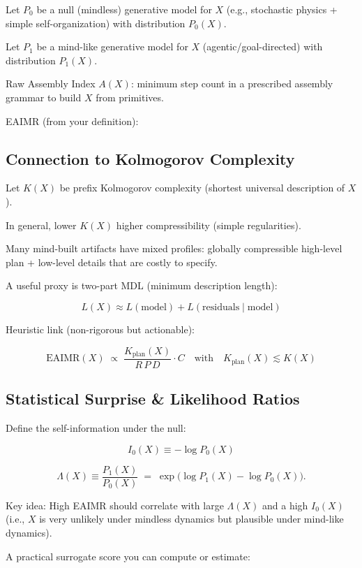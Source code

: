 \documentclass{article}
\begin{document}
Let \(P_0\) be a null (mindless) generative model for \(X\) (e.g., stochastic physics + simple self-organization) with distribution \(P_0(X)\).

Let \(P_1\) be a mind-like generative model for \(X\) (agentic/goal-directed) with distribution \(P_1(X)\).

Raw Assembly Index \(A(X)\): minimum step count in a prescribed assembly grammar to build \(X\) from primitives.

EAIMR (from your definition):


\subsection{Connection to Kolmogorov Complexity}

Let \(K(X)\) be prefix Kolmogorov complexity (shortest universal description of \(X\)).

In general, lower \(K(X)\) higher compressibility (simple regularities).

Many mind-built artifacts have mixed profiles: globally compressible high-level plan + low-level details that are costly to specify.

A useful proxy is two-part MDL (minimum description length):

\[L(X) \approx L(\text{model}) + L(\text{residuals}\mid\text{model})\]

Heuristic link (non-rigorous but actionable):

\[\text{EAIMR}(X) \;\propto\; \frac{K_\text{plan}(X)}{R\,P\,D} \cdot C \quad\text{with}\quad K_\text{plan}(X)\lesssim K(X)\]

\subsection{Statistical Surprise \& Likelihood Ratios}

Define the self-information under the null:

\[I_{0}(X) \equiv -\log P_{0}(X)\]

\[\Lambda(X) \equiv \frac{P_{1}(X)}{P_{0}(X)} \;=\; \exp\Big(\log P_{1}(X) - \log P_{0}(X)\Big).\]

Key idea: High EAIMR should correlate with large \(\Lambda(X)\) and a high \(I_0(X)\) (i.e., \(X\) is very unlikely under mindless dynamics but plausible under mind-like dynamics).

A practical surrogate score you can compute or estimate:
\end{document}
